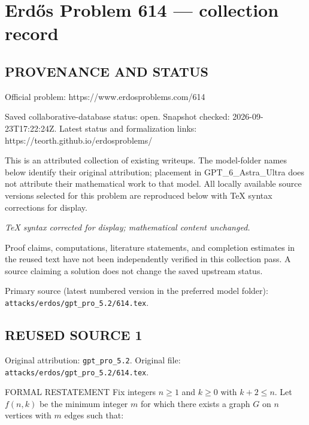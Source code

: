 \section*{Erd\H{o}s Problem 614 --- collection record}

\subsection*{PROVENANCE AND STATUS}
Official problem: https://www.erdosproblems.com/614

Saved collaborative-database status: open.
Snapshot checked: 2026-09-23T17:22:24Z.
Latest status and formalization links: https://teorth.github.io/erdosproblems/

This is an attributed collection of existing writeups. The model-folder names below identify their original attribution; placement in GPT\_6\_Astra\_Ultra does not attribute their mathematical work to that model. All locally available source versions selected for this problem are reproduced below with TeX syntax corrections for display.

\emph{TeX syntax corrected for display; mathematical content unchanged.}

Proof claims, computations, literature statements, and completion estimates in the reused text have not been independently verified in this collection pass. A source claiming a solution does not change the saved upstream status.

Primary source (latest numbered version in the preferred model folder): \texttt{attacks/erdos/gpt\_pro\_5.2/614.tex}.

\subsection*{REUSED SOURCE 1}
Original attribution: \texttt{gpt\_pro\_5.2}.
Original file: \texttt{attacks/erdos/gpt\_pro\_5.2/614.tex}.


FORMAL RESTATEMENT
Fix integers $n\ge 1$ and $k\ge 0$ with $k+2\le n$.
Let $f(n,k)$ be the minimum integer $m$ for which there exists a graph $G$ on $n$
vertices with $m$ edges such that:

